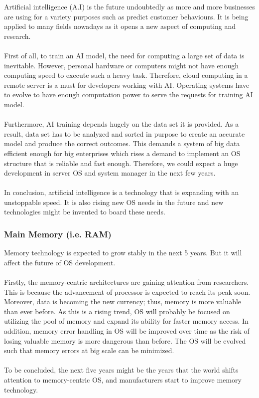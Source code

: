 Artificial intelligence (A.I) is the future undoubtedly as more and more businesses are using for a variety purposes such as predict customer behaviours. 
It is being applied to many fields nowadays as it opens a new aspect of computing and research. \\
\\
First of all, to train an AI model, the need for computing a large set of data is inevitable.
However, personal hardware or computers might not have enough computing speed to execute such a heavy task.
Therefore, cloud computing in a remote server is a must for developers working with AI.
Operating systems have to evolve to have enough computation power to serve the requests for training AI model. \\
\\
Furthermore, AI training depends hugely on the data set it is provided. 
As a result, data set has to be analyzed and sorted in purpose to create an accurate model and produce the correct outcomes.  
This demands a system of big data efficient enough for big enterprises which rises a demand to implement an OS structure that is reliable and fast enough. 
Therefore, we could expect a huge development in server OS and system manager in the next few years.
\\
\\
In conclusion, artificial intelligence is a technology that is expanding with an unstoppable speed.
It is also rising new OS needs in the future and new technologies might be invented to board these needs.


\subsubsection{Main Memory (i.e. RAM)}

Memory technology is expected to grow stably in the next 5 years. But it will affect the future of OS development. \\
\\
Firstly, the memory-centric architectures are gaining attention from researchers. This is because the advancement of processor is expected to reach its peak soon. 
Moreover, data is becoming the new currency; thus, memory is more valuable than ever before. 
As this is a rising trend, OS will probably be focused on utilizing the pool of memory and expand its ability for faster memory access. 
In addition, memory error handling in OS will be improved over time as the risk of losing valuable memory is more dangerous than before.
The OS will be evolved such that memory errors at big scale can be minimized. \\
\\
To be concluded, the next five years might be the years that the world shifts attention to memory-centric OS, and manufacturers start to improve memory technology.


